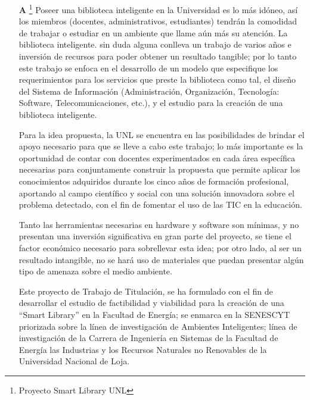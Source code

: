 \small{
\begin{itemize}
    \item[\textbf{A}] \footnote{Proyecto Smart Library UNL} Poseer una biblioteca inteligente en la Universidad es lo más idóneo, así los miembros (docentes, administrativos, estudiantes) tendrán la comodidad de trabajar o estudiar en un ambiente que llame aún más su atención.
    La biblioteca inteligente. sin duda alguna conlleva un trabajo de varios años e inversión de recursos para poder obtener un resultado tangible; por lo tanto este trabajo se enfoca en el desarrollo de un modelo que especifique los requerimientos para los servicios que preste la biblioteca como tal, el diseño del Sistema de Información (Administración, Organización, Tecnología: Software, Telecomunicaciones, etc.), y el estudio para la creación de una biblioteca inteligente.
    
    Para la idea propuesta, la UNL se encuentra en las posibilidades de brindar el apoyo necesario para que se lleve a cabo este trabajo; lo más importante es la oportunidad de contar con docentes experimentados en cada área específica necesarias para conjuntamente construir la propuesta que permite aplicar los conocimientos adquiridos durante los cinco años de formación profesional, aportando al campo científico y social con una solución innovadora sobre el problema detectado, con el fin de fomentar el uso de las TIC en la educación. 
    
    Tanto las herramientas necesarias en hardware y software son mínimas, y no presentan una inversión significativa en gran parte del proyecto, se tiene el factor económico necesario para sobrellevar esta idea; por otro lado, al ser un resultado intangible, no se hará uso de materiales que puedan presentar algún tipo de amenaza sobre el medio ambiente. 
    
    Este proyecto de Trabajo de Titulación, se ha formulado con el fin de desarrollar el estudio de factibilidad y viabilidad para la creación de una “Smart Library” en la Facultad de Energía; se enmarca en la SENESCYT priorizada sobre la línea de investigación de Ambientes Inteligentes; línea de investigación de la Carrera de Ingeniería en Sistemas de la Facultad de Energía las Industrias y los Recursos Naturales no Renovables de la Universidad Nacional de Loja. 
    

\end{itemize}}
